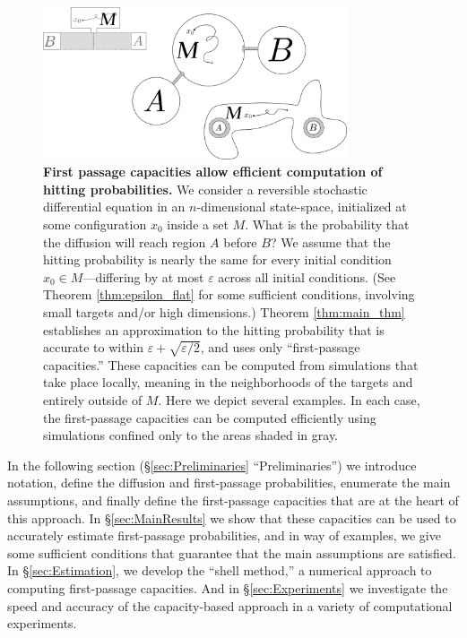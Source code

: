 \documentclass[12pt, nofootinbib,english, amsmath, amssymb, aps, priprint, graphicx,floatfix]{revtex4-1}
\theoremstyle{plain}
\theoremstyle{definition}
\theoremstyle{plain}
\begin{document}
\begin{figure}
    \centering  \includegraphics[width=0.8\textwidth]{bigpicture.png}
    \caption{\footnotesize\linespread{1.}\selectfont{} {\bf First passage capacities allow efficient computation of hitting probabilities.} We consider a reversible stochastic differential equation in an $n$-dimensional state-space, initialized at some configuration $x_0$ inside a set $M$. What is the probability that 
the diffusion will reach region $A$ before $B$?  We assume that the hitting probability is nearly the same for every initial condition $x_0 \in M$---differing by at most $\varepsilon$ 
across all initial conditions.  
(See Theorem \ref{thm:epsilon_flat} for some sufficient conditions, involving small targets and/or high dimensions.)
Theorem \ref{thm:main_thm} 
establishes an approximation to the hitting probability that
is accurate to within $\varepsilon + \sqrt{\varepsilon/2}$, and uses only ``first-passage capacities.'' These capacities can be computed from simulations that take place locally, meaning in the neighborhoods of the targets and entirely outside of $M$.  Here we depict several examples. In each case, the first-passage capacities can be computed efficiently using simulations confined only to the areas shaded in gray.}
\label{fig:ToyModel}
\vglue -1cm
\end{figure}


In the following section (\S\ref{sec:Preliminaries} ``Preliminaries'') we introduce notation, define the diffusion
and first-passage probabilities, enumerate the main assumptions, and finally define the first-passage capacities that are at the heart of this approach.  In \S\ref{sec:MainResults} we show that these capacities can be used to accurately estimate first-passage probabilities, and in way of examples, we give some sufficient conditions that guarantee that the main assumptions are satisfied. In \S\ref{sec:Estimation}, we develop the ``shell method,'' a numerical approach to computing first-passage capacities.   And in \S\ref{sec:Experiments} we investigate the speed and accuracy of the capacity-based approach in a variety of  
computational experiments.
\end{document}
